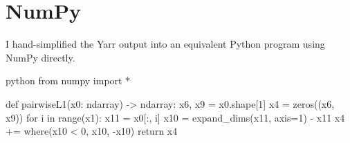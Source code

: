 \section*{NumPy}

I hand-simplified the Yarr output into an equivalent Python program using NumPy directly. 

\begin{center}    
\begin{cminted}{python}
from numpy import *

def pairwiseL1(x0: ndarray) -> ndarray:
    x6, x9 = x0.shape[1]
    x4 = zeros((x6, x9))
    for i in range(x1):
        x11 = x0[:, i]
        x10 = expand_dims(x11, axis=1) - x11
        x4 += where(x10 < 0, x10, -x10)
    return x4
\end{cminted}
\end{center}
